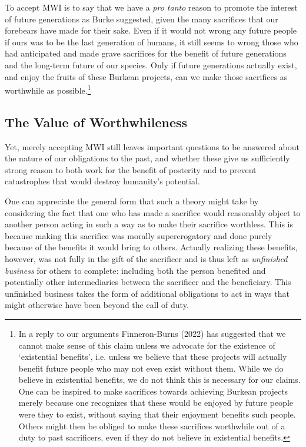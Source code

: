 \documentclass[man,11pt,a4paper]{apa7}
\begin{document}
To accept MWI is to say that we have a \textit{pro tanto} reason to promote the interest of future generations as Burke suggested, given the many sacrifices that our forebears have made for their sake. Even if it would not wrong any future people if ours was to be the last generation of humans, it still seems to wrong those who had anticipated and made grave sacrifices for the benefit of future generations and the long-term future of our species. Only if future generations actually exist, and enjoy the fruits of these Burkean projects, can we make those sacrifices as worthwhile as possible.\footnote{In a reply to our arguments Finneron-Burns (2022) has suggested that we cannot make sense of this claim unless we advocate for the existence of `existential benefits', i.e. unless we believe that these projects will actually benefit future people who may not even exist without them. While we do believe in existential benefits, we do not think this is necessary for our claims. One can be inspired to make sacrifices towards achieving Burkean projects merely because one recognizes that these would be enjoyed by future people were they to exist, without saying that their enjoyment benefits such people. Others might then be obliged to make these sacrifices worthwhile out of a duty to past sacrificers, even if they do not believe in existential benefits.}

\subsection{The Value of Worthwhileness}

Yet, merely accepting MWI still leaves important questions to be answered about the nature of our obligations to the past, and whether these give us sufficiently strong reason to both work for the benefit of posterity and to prevent catastrophes that would destroy humanity's potential.

One can appreciate the general form that such a theory might take by considering the fact that one who has made a sacrifice would reasonably object to another person acting in such a way as to make their sacrifice worthless. This is because making this sacrifice was morally supererogatory and done purely because of the benefits it would bring to others. Actually realizing these benefits, however, was not fully in the gift of the sacrificer and is thus left as \textit{unfinished business} for others to complete: including both the person benefited and potentially other intermediaries between the sacrificer and the beneficiary. This unfinished business takes the form of additional obligations to act in ways that might otherwise have been beyond the call of duty.
\end{document}
